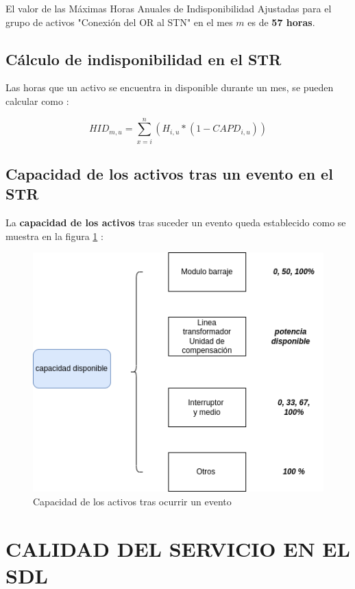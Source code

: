\documentclass[a5paper]{book}%
\begin{document}
El valor de las Máximas Horas Anuales de Indisponibilidad Ajustadas para el grupo de activos "Conexión del OR al STN" en el mes $m$ es de \textbf{57 horas}.

\subsection{Cálculo de indisponibilidad en el STR}
Las horas que un activo  se encuentra  in disponible durante un mes, se pueden calcular como \cite{CREG0152018}:

\[ HID_{m,u} = \sum_{x=i}^{n}(H_{i,u}*(1-CAPD_{i,u}))  \]

\subsection{Capacidad de los activos tras un evento en el STR}

    La \textbf{capacidad de los activos} tras suceder un evento queda establecido  como se muestra en la figura \ref{fig:capacidad} \cite{CREG0152018}:

    \begin{figure}[H]
      \centering
      \caption[capacidad]{Capacidad de los activos tras ocurrir un evento}
      \label{fig:capacidad}
      \includegraphics[width=\linewidth]{capacidad_eventos}
    \end{figure}




    \section{CALIDAD DEL SERVICIO EN EL SDL}
\end{document}
